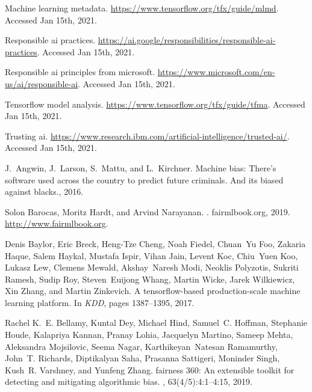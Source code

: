 \documentclass[11pt]{article}
\begin{document}
\begin{thebibliography}{10}
\itemsep=1pt

Machine learning metadata.
\newblock \url{https://www.tensorflow.org/tfx/guide/mlmd}.
\newblock Accessed Jan 15th, 2021.

Responsible ai practices.
\newblock \url{https://ai.google/responsibilities/responsible-ai-practices}.
\newblock Accessed Jan 15th, 2021.

Responsible ai principles from microsoft.
\newblock \url{https://www.microsoft.com/en-us/ai/responsible-ai}.
\newblock Accessed Jan 15th, 2021.

Tensorflow model analysis.
\newblock \url{https://www.tensorflow.org/tfx/guide/tfma}.
\newblock Accessed Jan 15th, 2021.

Trusting ai.
\newblock
  \url{https://www.research.ibm.com/artificial-intelligence/trusted-ai/}.
\newblock Accessed Jan 15th, 2021.

J.~Angwin, J.~Larson, S.~Mattu, and L.~Kirchner.
\newblock Machine bias: {T}here's software used across the country to predict
  future criminals. {A}nd its biased against blacks., 2016.

Solon Barocas, Moritz Hardt, and Arvind Narayanan.
.
\newblock fairmlbook.org, 2019.
\newblock \url{http://www.fairmlbook.org}.

Denis Baylor, Eric Breck, Heng{-}Tze Cheng, Noah Fiedel, Chuan~Yu Foo, Zakaria
  Haque, Salem Haykal, Mustafa Ispir, Vihan Jain, Levent Koc, Chiu~Yuen Koo,
  Lukasz Lew, Clemens Mewald, Akshay~Naresh Modi, Neoklis Polyzotis, Sukriti
  Ramesh, Sudip Roy, Steven~Euijong Whang, Martin Wicke, Jarek Wilkiewicz, Xin
  Zhang, and Martin Zinkevich.
 {A} tensorflow-based production-scale machine learning
  platform.
\newblock In {\em KDD}, pages 1387--1395, 2017.

Rachel K.~E. Bellamy, Kuntal Dey, Michael Hind, Samuel~C. Hoffman, Stephanie
  Houde, Kalapriya Kannan, Pranay Lohia, Jacquelyn Martino, Sameep Mehta,
  Aleksandra Mojsilovic, Seema Nagar, Karthikeyan~Natesan Ramamurthy, John~T.
  Richards, Diptikalyan Saha, Prasanna Sattigeri, Moninder Singh, Kush~R.
  Varshney, and Yunfeng Zhang.
 fairness 360: An extensible toolkit for detecting and mitigating
  algorithmic bias.
, 63(4/5):4:1--4:15, 2019.


\end{thebibliography}
\end{document}
